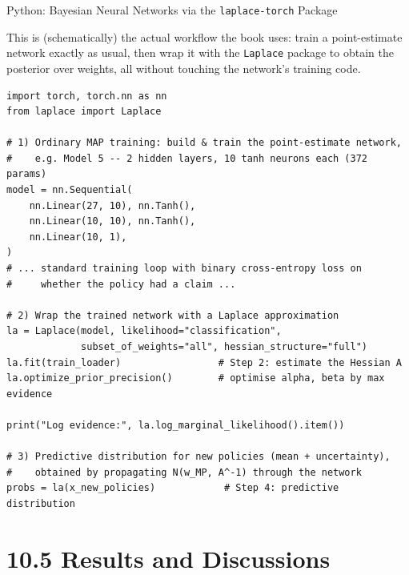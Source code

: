 \documentclass[aspectratio=169,10pt]{beamer}
\begin{document}
\begin{frame}[fragile]{Python: Bayesian Neural Networks via the \texttt{laplace-torch} Package}

This is (schematically) the actual workflow the book uses: train a
point-estimate network exactly as usual, then wrap it with the
\texttt{Laplace} package to obtain the posterior over weights, all without
touching the network's training code.

\begin{lstlisting}[caption={Schematic workflow following Daxberger et al. (2021)}]
import torch, torch.nn as nn
from laplace import Laplace

# 1) Ordinary MAP training: build & train the point-estimate network,
#    e.g. Model 5 -- 2 hidden layers, 10 tanh neurons each (372 params)
model = nn.Sequential(
    nn.Linear(27, 10), nn.Tanh(),
    nn.Linear(10, 10), nn.Tanh(),
    nn.Linear(10, 1),
)
# ... standard training loop with binary cross-entropy loss on
#     whether the policy had a claim ...

# 2) Wrap the trained network with a Laplace approximation
la = Laplace(model, likelihood="classification",
             subset_of_weights="all", hessian_structure="full")
la.fit(train_loader)                 # Step 2: estimate the Hessian A
la.optimize_prior_precision()        # optimise alpha, beta by max evidence

print("Log evidence:", la.log_marginal_likelihood().item())

# 3) Predictive distribution for new policies (mean + uncertainty),
#    obtained by propagating N(w_MP, A^-1) through the network
probs = la(x_new_policies)            # Step 4: predictive distribution
\end{lstlisting}

\end{frame}

\section{10.5 Results and Discussions}
\end{document}

